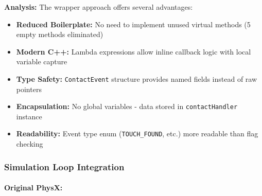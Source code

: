 \textbf{Analysis:} The wrapper approach offers several advantages:

\begin{itemize}
    \item \textbf{Reduced Boilerplate:} No need to implement unused virtual methods (5 empty methods eliminated)
    \item \textbf{Modern C++:} Lambda expressions allow inline callback logic with local variable capture
    \item \textbf{Type Safety:} \texttt{ContactEvent} structure provides named fields instead of raw pointers
    \item \textbf{Encapsulation:} No global variables - data stored in \texttt{contactHandler} instance
    \item \textbf{Readability:} Event type enum (\texttt{TOUCH\_FOUND}, etc.) more readable than flag checking
\end{itemize}

\subsubsection{Simulation Loop Integration}

\paragraph{Original PhysX:}

